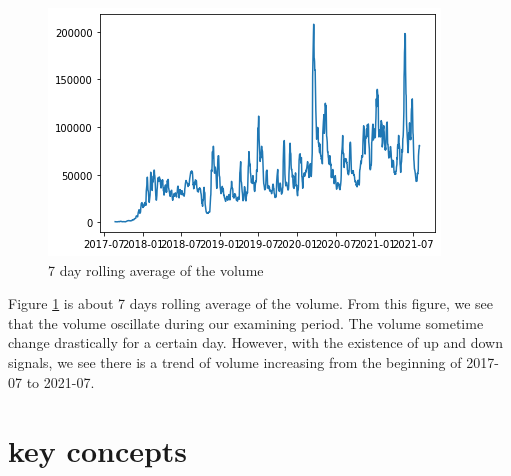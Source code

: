 \documentclass[twoside]{report}
\begin{document}
\begin{spacing}{1}
\begin{figure}[!htbp]
    \centering
    \includegraphics[scale = 0.5]{Images/Volume Rolling Average.png}
    \caption{7 day rolling average of the volume}
    \label{7day rolling volume}
\end{figure}

Figure \ref{7day rolling volume} is about 7 days rolling average of the volume. From this figure, we see that the volume oscillate during our examining period. The volume sometime change drastically for a certain day. However, with the existence of up and down signals, we see there is a trend of volume increasing from the beginning of 2017-07 to 2021-07.






\section{key concepts}


\end{spacing}
\end{document}
